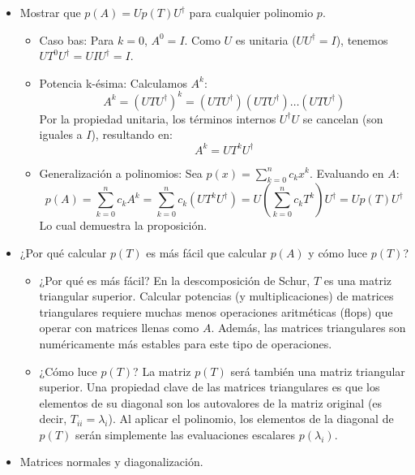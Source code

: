 \documentclass[11pt,spanish]{article}
\begin{document}
\begin{itemize}
\item[a)] Mostrar que $p(A) = U p(T) U^\dagger$ para cualquier polinomio $p$.

\begin{itemize}
\item Caso bas: Para $k = 0$, $A^0 = I$. Como $U$ es unitaria ($U U^\dagger = I$), tenemos $U T^0 U^\dagger = U I U^\dagger = I$.
\item Potencia k-ésima: Calculamos $A^k$:
    $$A^k = (U T U^\dagger)^k = (U T U^\dagger)(U T U^\dagger) \dots (U T U^\dagger)$$
    Por la propiedad unitaria, los términos internos $U^\dagger U$ se cancelan (son iguales a $I$), resultando en:
    $$A^k = U T^k U^\dagger$$
\item Generalización a polinomios: Sea $p(x) = \sum_{k=0}^n c_k x^k$. Evaluando en $A$:
    $$p(A) = \sum_{k=0}^n c_k A^k = \sum_{k=0}^n c_k (U T^k U^\dagger) = U \left( \sum_{k=0}^n c_k T^k \right) U^\dagger = U p(T) U^\dagger$$
    Lo cual demuestra la proposición.
\end{itemize}

\item[b)] ¿Por qué calcular $p(T)$ es más fácil que calcular $p(A)$ y cómo luce $p(T)$?

\begin{itemize}
\item ¿Por qué es más fácil? En la descomposición de Schur, $T$ es una matriz triangular superior. Calcular potencias (y multiplicaciones) de matrices triangulares requiere muchas menos operaciones aritméticas (flops) que operar con matrices llenas como $A$. Además, las matrices triangulares son numéricamente más estables para este tipo de operaciones.
\item ¿Cómo luce $p(T)$? La matriz $p(T)$ será también una matriz triangular superior. Una propiedad clave de las matrices triangulares es que los elementos de su diagonal son los autovalores de la matriz original (es decir, $T_{ii} = \lambda_i$). Al aplicar el polinomio, los elementos de la diagonal de $p(T)$ serán simplemente las evaluaciones escalares $p(\lambda_i)$.
\end{itemize}

\item[c)] Matrices normales y diagonalización.


\end{itemize}
\end{document}
